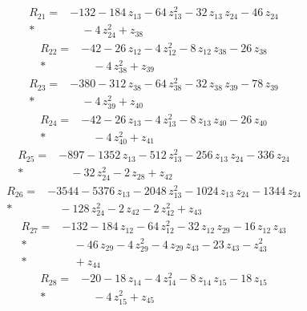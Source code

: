 \documentclass[10pt]{article}
\begin{document}
\begin{align*}
R_{21}={}& - 132 - 184\,z_{13} - 64\,z_{13}^{2} - 32\,z_{13}\,z_{24} - 46\,z_{24} \\*
&\quad - 4\,z_{24}^{2} + z_{38}
\end{align*}
\begin{align*}
R_{22}={}& - 42 - 26\,z_{12} - 4\,z_{12}^{2} - 8\,z_{12}\,z_{38} - 26\,z_{38} \\*
&\quad - 4\,z_{38}^{2} + z_{39}
\end{align*}
\begin{align*}
R_{23}={}& - 380 - 312\,z_{38} - 64\,z_{38}^{2} - 32\,z_{38}\,z_{39} - 78\,z_{39} \\*
&\quad - 4\,z_{39}^{2} + z_{40}
\end{align*}
\begin{align*}
R_{24}={}& - 42 - 26\,z_{13} - 4\,z_{13}^{2} - 8\,z_{13}\,z_{40} - 26\,z_{40} \\*
&\quad - 4\,z_{40}^{2} + z_{41}
\end{align*}
\begin{align*}
R_{25}={}& - 897 - 1352\,z_{13} - 512\,z_{13}^{2} - 256\,z_{13}\,z_{24} - 336\,z_{24} \\*
&\quad - 32\,z_{24}^{2} - 2\,z_{28} + z_{42}
\end{align*}
\begin{align*}
R_{26}={}& - 3544 - 5376\,z_{13} - 2048\,z_{13}^{2} - 1024\,z_{13}\,z_{24} - 1344\,z_{24} \\*
&\quad - 128\,z_{24}^{2} - 2\,z_{42} - 2\,z_{42}^{2} + z_{43}
\end{align*}
\begin{align*}
R_{27}={}& - 132 - 184\,z_{12} - 64\,z_{12}^{2} - 32\,z_{12}\,z_{29} - 16\,z_{12}\,z_{43} \\*
&\quad - 46\,z_{29} - 4\,z_{29}^{2} - 4\,z_{29}\,z_{43} - 23\,z_{43} - z_{43}^{2} \\*
&\quad + z_{44}
\end{align*}
\begin{align*}
R_{28}={}& - 20 - 18\,z_{14} - 4\,z_{14}^{2} - 8\,z_{14}\,z_{15} - 18\,z_{15} \\*
&\quad - 4\,z_{15}^{2} + z_{45}
\end{align*}
\end{document}
